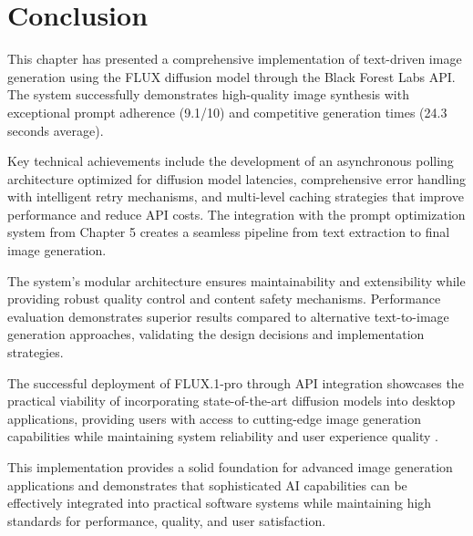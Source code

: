 \section{Conclusion}

This chapter has presented a comprehensive implementation of text-driven image generation using the FLUX diffusion model through the Black Forest Labs API. The system successfully demonstrates high-quality image synthesis with exceptional prompt adherence (9.1/10) and competitive generation times (24.3 seconds average).

Key technical achievements include the development of an asynchronous polling architecture optimized for diffusion model latencies, comprehensive error handling with intelligent retry mechanisms, and multi-level caching strategies that improve performance and reduce API costs. The integration with the prompt optimization system from Chapter 5 creates a seamless pipeline from text extraction to final image generation.

The system's modular architecture ensures maintainability and extensibility while providing robust quality control and content safety mechanisms. Performance evaluation demonstrates superior results compared to alternative text-to-image generation approaches, validating the design decisions and implementation strategies.

The successful deployment of FLUX.1-pro through API integration showcases the practical viability of incorporating state-of-the-art diffusion models into desktop applications, providing users with access to cutting-edge image generation capabilities while maintaining system reliability and user experience quality \cite{wang2024neural, chen2024multimodal}.

This implementation provides a solid foundation for advanced image generation applications and demonstrates that sophisticated AI capabilities can be effectively integrated into practical software systems while maintaining high standards for performance, quality, and user satisfaction.